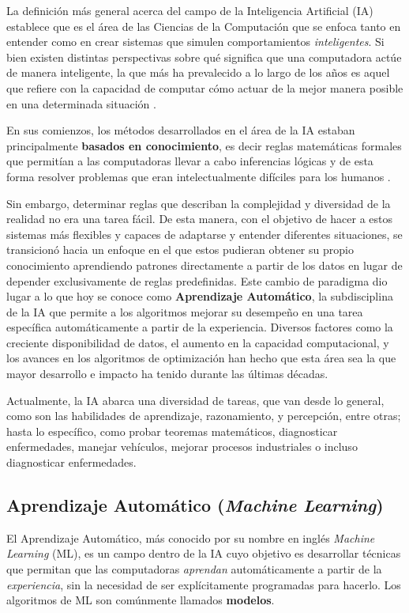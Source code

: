 \documentclass[../../main.tex]{subfiles}
\begin{document}
La definición más general acerca del campo de la Inteligencia Artificial (IA) establece que es el área de las Ciencias de la Computación que se enfoca tanto en entender como en crear sistemas que simulen comportamientos \textit{inteligentes}. Si bien existen distintas perspectivas sobre qué significa que una computadora actúe de manera inteligente, la que más ha prevalecido a lo largo de los años es aquel que refiere con la capacidad de computar cómo actuar de la mejor manera posible en una determinada situación \cite{ai-a-modern-approach}. 

En sus comienzos, los métodos desarrollados en el área de la IA estaban principalmente \textbf{basados en conocimiento}, es decir reglas matemáticas formales que permitían a las computadoras llevar a cabo inferencias lógicas y de esta forma resolver problemas que eran intelectualmente difíciles para los humanos \cite{deep-learning}.

Sin embargo, determinar reglas que describan la complejidad y diversidad de la realidad no era una tarea fácil. De esta manera, con el objetivo de hacer a estos sistemas más flexibles y capaces de adaptarse y entender diferentes situaciones, se transicionó hacia un enfoque en el que estos pudieran obtener su propio conocimiento aprendiendo patrones directamente a partir de los datos en lugar de depender exclusivamente de reglas predefinidas. Este cambio de paradigma dio lugar a lo que hoy se conoce como \textbf{Aprendizaje Automático}, la subdisciplina de la IA que permite a los algoritmos mejorar su desempeño en una tarea específica automáticamente a partir de la experiencia. Diversos factores como la creciente disponibilidad de datos, el aumento en la capacidad computacional, y los avances en los algoritmos de optimización \cite{deep-learning} han hecho que esta área sea la que mayor desarrollo e impacto ha tenido durante las últimas décadas. 

Actualmente, la IA abarca una diversidad de tareas, que van desde lo general, como son las habilidades de aprendizaje, razonamiento, y percepción, entre otras; hasta lo específico, como probar teoremas matemáticos, diagnosticar enfermedades, manejar vehículos, mejorar procesos industriales o incluso diagnosticar enfermedades.

\subsection{Aprendizaje Automático (\textit{Machine Learning})}
El Aprendizaje Automático, más conocido por su nombre en inglés \textit{Machine Learning} (ML), es un campo dentro de la IA cuyo objetivo es desarrollar técnicas que permitan que las computadoras \textit{aprendan} automáticamente a partir de la \textit{experiencia}, sin la necesidad de ser explícitamente programadas para hacerlo. Los algoritmos de ML son comúnmente llamados \textbf{modelos}.
\end{document}
